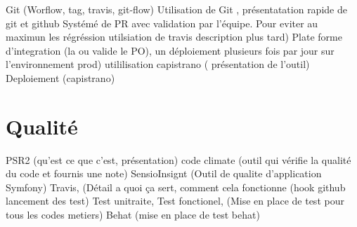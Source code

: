 Git (Worflow, tag, travis, git-flow) 
Utilisation de Git , présentatation rapide de git et github
Systémé de PR avec validation par l'équipe. 
Pour eviter au maximun les régréssion utilsiation de travis description plus tard)
Plate forme d'integration (la ou valide le PO), un déploiement plusieurs fois par jour sur l'environnement prod) utililisation capistrano ( présentation de l'outil) 
Deploiement (capistrano)
\section{Qualité}
PSR2 (qu'est ce que c'est, présentation)
code climate (outil qui vérifie la qualité du code et fournis une note) 
SensioInsignt (Outil de qualite d'application Symfony)
Travis, (Détail a quoi ça sert, comment cela fonctionne (hook github lancement des test) 
Test unitraite, Test fonctionel, (Mise en place de test  pour tous les codes metiers) 
Behat (mise en place de test behat) 
